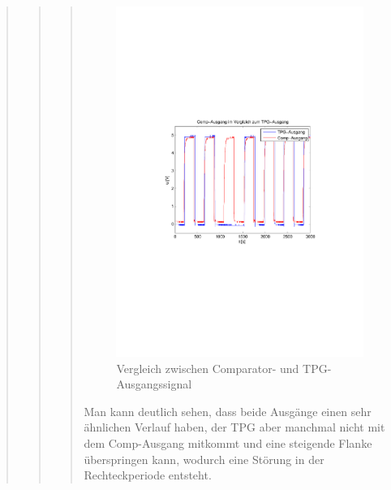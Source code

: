 \begin{quote}
\begin{quote}
\begin{quote}
            
             \begin{figure}[H] \centering
                    \includegraphics[scale=0.5, trim = 4cm 9.5cm 3.5cm 9.5cm,
                    clip]{./Bilder/comp_vs_tpg}
                        \caption{Vergleich zwischen Comparator- und
                        TPG-Ausgangssignal}
                \end{figure}
          
          Man kann deutlich sehen, dass beide Ausgänge einen sehr ähnlichen
          Verlauf haben, der TPG aber manchmal nicht mit dem Comp-Ausgang
          mitkommt und eine steigende Flanke überspringen kann, wodurch eine
          Störung in der Rechteckperiode entsteht.\\
          
          \vspace{0.5em}
          

\end{quote}
\end{quote}
\end{quote}
